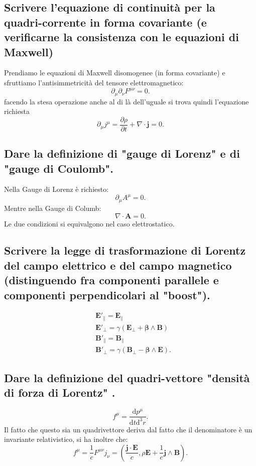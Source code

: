 \subsection[]{Scrivere l'equazione di continuità per la quadri-corrente in forma covariante (e verificarne la consistenza con le equazioni di Maxwell)}
\label{sec:3.a.5}
Prendiamo le equazioni di Maxwell disomogenee (in forma covariante) e sfruttiamo l'antisimmetricità del tensore elettromagnetico:
\[
	\partial_{\mu}\partial_{\nu}F^{\mu\nu}=0
.\] 
facendo la stesa operazione anche al di là dell'uguale si trova quindi l'equazione richiesta
\[
	\partial_{\mu}j^{\mu}= \frac{\partial \rho}{\partial t} + \nabla\cdot \boldsymbol{j}=0
.\] 
\subsection[]{Dare la definizione di "gauge di Lorenz" e di "gauge di Coulomb".}
\label{sec:3.a.6}
Nella Gauge di Lorenz è richiesto:
\[
	\partial_{\mu}A^{\mu}=0
.\] 
Mentre nella Gauge di Columb:
\[
	\nabla\cdot \boldsymbol{A}=0
.\] 
Le due condizioni si equivalgono nel caso elettrostatico.

\subsection[]{Scrivere la legge di trasformazione di Lorentz del campo elettrico e del campo magnetico (distinguendo fra componenti parallele e componenti perpendicolari al "boost").}
\label{sec:3.a.7}
\begin{align*}
	&\boldsymbol{E}'_{\|} = \boldsymbol{E}_{\|}\\
	&\boldsymbol{E}'_{\bot}=\gamma\left( \boldsymbol{E}_{\bot}+ \boldsymbol{\beta} \wedge \boldsymbol{B} \right)\\
	&\boldsymbol{B}'_{\|}=\boldsymbol{B}_{\|}\\
	&\boldsymbol{B}'_{\bot}=\gamma\left( \boldsymbol{B}_{\bot}-\boldsymbol{\beta}\wedge \boldsymbol{E}  \right) 
.\end{align*}

\subsection[]{Dare la definizione del quadri-vettore "densità di forza di Lorentz" .}
\label{sec:3.a.8}
\[
	f^{\mu}=\frac{\mbox{d} p^{\mu}}{\mbox{d} t \text{d}^3r} 
.\] 
Il fatto che questo sia un quadrivettore deriva dal fatto che il denominatore è un invariante relativistico, si ha inoltre che:
\[
	f^{\mu}=\frac{1}{c}F^{\mu\nu}j_{\nu}=\left(\frac{\boldsymbol{j}\cdot\boldsymbol{E}}{c},\rho\boldsymbol{E}+\frac{1}{c}\boldsymbol{j}\wedge\boldsymbol{B}\right)
.\] 

